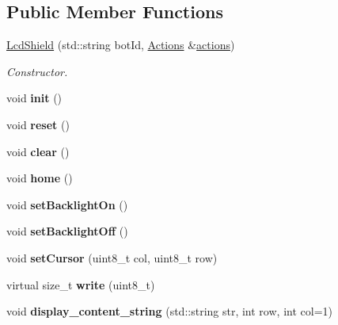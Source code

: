 \subsection*{Public Member Functions}
\begin{DoxyCompactItemize}
\item 
\hyperlink{classLcdShield_adf69aee9cba76742905ec98b0c3902d5}{Lcd\+Shield} (std\+::string bot\+Id, \hyperlink{classActions}{Actions} \&\hyperlink{classAActionsElement_a3fbd5b8201049a59602d8b7201a9ef8a}{actions})
\begin{DoxyCompactList}\small\item\em Constructor. \end{DoxyCompactList}\item 
\mbox{\label{classLcdShield_a0575c9063dd1860ea6b8d5b47f518c59}} 
void {\bfseries init} ()
\item 
\mbox{\label{classLcdShield_a6a7281ea6adf98a4ab23ce79a7a0d323}} 
void {\bfseries reset} ()
\item 
\mbox{\label{classLcdShield_a9a329fba00c24f56f24266225dcb6a16}} 
void {\bfseries clear} ()
\item 
\mbox{\label{classLcdShield_acc5bf1b9f43c50c7ef008462343c19c6}} 
void {\bfseries home} ()
\item 
\mbox{\label{classLcdShield_a7e248adbf31034c0ce7a6a2565852073}} 
void {\bfseries set\+Backlight\+On} ()
\item 
\mbox{\label{classLcdShield_a5fcfa31aff341194a6eebe280263e4ee}} 
void {\bfseries set\+Backlight\+Off} ()
\item 
\mbox{\label{classLcdShield_afb23b41227f1de62c1ac3ce853da71e4}} 
void {\bfseries set\+Cursor} (uint8\+\_\+t col, uint8\+\_\+t row)
\item 
\mbox{\label{classLcdShield_a01776bf1cd2cdac44396ca709843b269}} 
virtual size\+\_\+t {\bfseries write} (uint8\+\_\+t)
\item 
\mbox{\label{classLcdShield_a20c913984be66e3eac4b46a1926285f5}} 
void {\bfseries display\+\_\+content\+\_\+string} (std\+::string str, int row, int col=1)

\end{DoxyCompactItemize}
